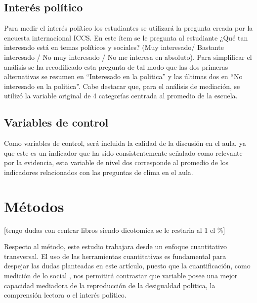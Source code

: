 \documentclass[12pt,twoside]{templates/facsothesis}
\begin{document}
\hypertarget{interuxe9s-poluxedtico}{%
\subsection{Interés político}\label{interuxe9s-poluxedtico}}

Para medir el interés político los estudiantes se utilizará la pregunta creada por la encuesta internacional ICCS. En este ítem se le pregunta al estudiante ¿Qué tan interesado está en temas políticos y sociales? (Muy interesado/ Bastante interesado / No muy interesado / No me interesa en absoluto). Para simplificar el análisis se ha recodificado esta pregunta de tal modo que las dos primeras alternativas se resumen en ``Interesado en la politica'' y las últimas dos en ``No interesado en la politica''. Cabe destacar que, para el análisis de mediación, se utilizó la variable original de 4 categorías centrada al promedio de la escuela.

\hypertarget{variables-de-control}{%
\subsection{Variables de control}\label{variables-de-control}}

Como variables de control, será incluida la calidad de la discusión en el aula, ya que este es un indicador que ha sido consistentemente señalado como relevante por la evidencia, esta variable de nivel dos corresponde al promedio de los indicadores relacionados con las preguntas de clima en el aula.

\hypertarget{muxe9todos}{%
\section{Métodos}\label{muxe9todos}}

{[}tengo dudas con centrar libros siendo dicotomica se le restaria al 1 el \%{]}

Respecto al método, este estudio trabajara desde un enfoque cuantitativo transversal. El uso de las herramientas cuantitativas es fundamental para despejar las dudas planteadas en este artículo, puesto que la cuantificación, como medición de lo social \citep[Asún, 2006][]{canalesMETODOLOGIASINVESTIGACIONSOCIAL2006}, nos permitirá contrastar que variable posee una mejor capacidad mediadora de la reproducción de la desigualdad politica, la comprensión lectora o el interés político.
\end{document}
